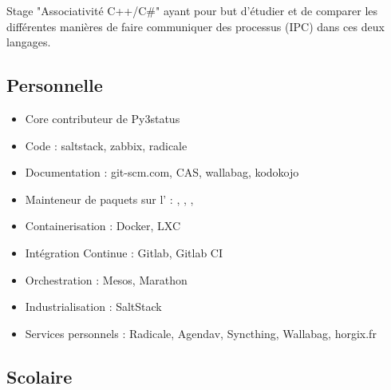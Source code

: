 \documentclass[10pt,a4paper]{moderncv}
\begin{document}
{Stage "Associativité C++/C\#" ayant pour but d'étudier et de comparer les
différentes manières de faire communiquer des processus (IPC) dans ces deux
langages.}

\bigskip
\subsection{Personnelle}

{
  \begin{itemize}
    \item Core contributeur de Py3status
    \item Code : saltstack, zabbix, radicale
    \item Documentation : git-scm.com, CAS, wallabag, kodokojo
    \item Mainteneur de paquets sur l' :
      ,
      ,
      ,
  \end{itemize}
}

{\begin{itemize}
  \item Containerisation : Docker, LXC
  \item Intégration Continue : Gitlab, Gitlab CI
  \item Orchestration : Mesos, Marathon
  \item Industrialisation : SaltStack
  \item Services personnels : Radicale, Agendav, Syncthing, Wallabag, horgix.fr
\end{itemize}
}

\subsection{Scolaire}
\end{document}
